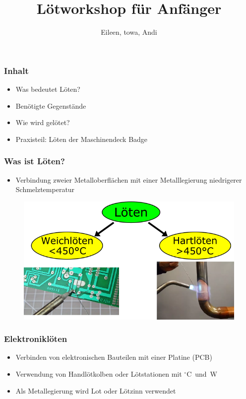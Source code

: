 \documentclass[10pt]{beamer}
\title[soldering-workshop] %
{Lötworkshop für Anfänger}
\author{Eileen, towa, Andi}
\begin{document}
    \maketitle
    
    
    \begin{frame}
    \frametitle{Inhalt}
    \begin{itemize}
    	\item{Was bedeutet Löten?}
    	\item{Benötigte Gegenstände}
    	\item{Wie wird gelötet?}
    	\item{Praxisteil: Löten der Maschinendeck Badge}
    \end{itemize}
	\end{frame}
    
    \begin{frame}
    \frametitle{Was ist Löten?}
    \begin{itemize}
    	\item{Verbindung zweier Metalloberflächen mit einer Metalllegierung niedrigerer Schmelztemperatur}
    \end{itemize}
	\begin{figure}[hbtp]
		\centering
		\includegraphics[width=\linewidth*2/3]{images/weich_hartloeten.png}
	\end{figure}
	\end{frame}

	\begin{frame}
	\frametitle{Elektroniklöten}
	\begin{itemize}
		\item{Verbinden von elektronischen Bauteilen mit einer Platine (PCB)}
		\item{Verwendung von Handlötkolben oder Lötstationen mit \unit[300 - 400]{$^\circ$C} und \unit[30 - 100]{W}}
		\item{Als Metallegierung wird Lot oder Lötzinn verwendet}
	\end{itemize}
	\end{frame}
\end{document}
